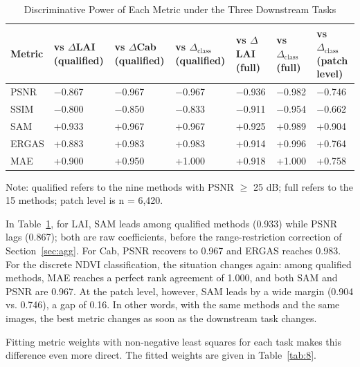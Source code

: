 \documentclass[a4paper,fleqn]{cas-dc}
\begin{document}
\begin{table}[!t]
\renewcommand{\arraystretch}{1.05}
\caption{Discriminative Power of Each Metric under the Three Downstream Tasks\label{tab:7}}
\centering
\scriptsize
\setlength{\tabcolsep}{3.2pt}
\begin{tabular}{@{}l*{6}{>{\centering\arraybackslash}p{0.98in}}@{}}
\hline
\textbf{Metric} & \textbf{vs $\Delta$LAI (qualified)} & \textbf{vs $\Delta$Cab (qualified)} & \textbf{vs $\Delta_{\mathrm{class}}$ (qualified)} & \textbf{vs $\Delta$LAI (full)} & \textbf{vs $\Delta_{\mathrm{class}}$ (full)} & \textbf{vs $\Delta_{\mathrm{class}}$ (patch level)} \\
\hline
PSNR & $-$0.867 & $-$0.967 & $-$0.967 & $-$0.936 & $-$0.982 & $-$0.746 \\
SSIM & $-$0.800 & $-$0.850 & $-$0.833 & $-$0.911 & $-$0.954 & $-$0.662 \\
SAM & +0.933 & +0.967 & +0.967 & +0.925 & +0.989 & +0.904 \\
ERGAS & +0.883 & +0.983 & +0.983 & +0.914 & +0.996 & +0.764 \\
MAE & +0.900 & +0.950 & +1.000 & +0.918 & +1.000 & +0.758 \\
\hline
\end{tabular}
\par\vspace{2pt}
\parbox{\textwidth}{\footnotesize Note: qualified refers to the nine methods with PSNR $\geq$ 25 dB; full refers to the 15 methods; patch level is n = 6,420.\par}
\end{table}

In Table~\ref{tab:7}, for LAI, SAM leads among qualified methods (0.933) while PSNR lags (0.867); both are raw coefficients, before the range-restriction correction of Section~\ref{sec:agg}. For Cab, PSNR recovers to 0.967 and ERGAS reaches 0.983. For the discrete NDVI classification, the situation changes again: among qualified methods, MAE reaches a perfect rank agreement of 1.000, and both SAM and PSNR are 0.967. At the patch level, however, SAM leads by a wide margin (0.904 vs. 0.746), a gap of 0.16. In other words, with the same methods and the same images, the best metric changes as soon as the downstream task changes.

Fitting metric weights with non-negative least squares for each task makes this difference even more direct. The fitted weights are given in Table~\ref{tab:8}.
\end{document}
